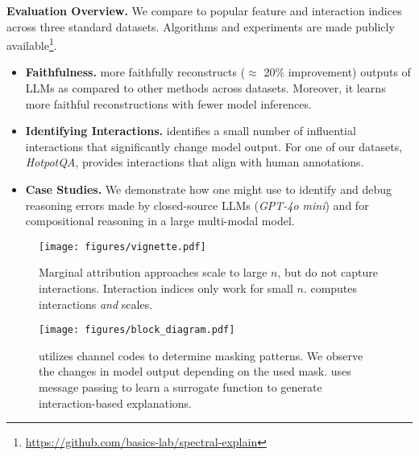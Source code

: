 \textbf{Evaluation Overview.} We compare \SpecExp{} to popular feature and interaction indices across three standard datasets. Algorithms and experiments are made publicly available\footnote{\url{https://github.com/basics-lab/spectral-explain}}.
\begin{itemize}[topsep=0pt, itemsep=0pt,leftmargin=6pt]
    \item \textbf{Faithfulness.}  \SpecExp{}  more faithfully reconstructs ($\approx$ 20\% improvement) outputs of LLMs as compared to other methods across datasets. Moreover, it learns more faithful reconstructions with fewer model inferences.
    \item \textbf{Identifying Interactions.} \SpecExp{}  identifies a small number of influential interactions that significantly change model output. For one of our datasets, \textit{HotpotQA}, \SpecExp{} provides interactions that align with human annotations.
    \item \textbf{Case Studies.} We demonstrate how one might use \SpecExp{} to identify and debug reasoning errors made by closed-source LLMs (\emph{GPT-4o mini}) and for compositional reasoning in a large multi-modal model.
\end{itemize}

\begin{figure}[h]
    \centering
    \texttt{[image: figures/vignette.pdf]}\vspace{-8pt}
    \caption{Marginal attribution approaches scale to large $n$, but do not capture interactions. Interaction indices only work for small $n$. \SpecExp{}  computes interactions \emph{and} scales.}
    \label{fig:phase-feasible-diagram}
    \vspace{-10pt}
\end{figure}


\begin{figure*}
    \centering
    \texttt{[image: figures/block\_diagram.pdf]}
    \caption{\SpecExp{} utilizes channel codes to determine masking patterns.  We observe the changes in model output depending on the used mask. \SpecExp{} uses message passing to learn a surrogate function to generate interaction-based explanations.}
    \vspace{-5pt}
    \label{fig:algorithm-block}
\end{figure*}
























